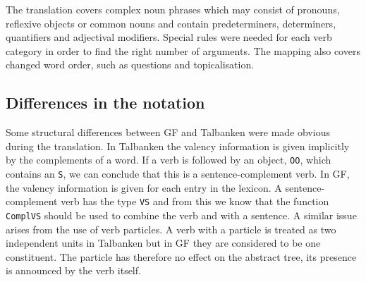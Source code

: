 \documentclass{report}
\begin{document}
The translation covers complex noun phrases which may consist of pronouns,
reflexive objects or common nouns and contain predeterminers, 
determiners, quantifiers and adjectival modifiers. Special rules were needed
for each verb category in order to find the right number of arguments.
The mapping also covers changed word order, such as questions and topicalisation.



\subsection{Differences in the notation}
Some structural differences between GF and Talbanken were made obvious during the
translation.
In Talbanken the valency information is given implicitly by the complements
of a word. If a verb is followed by an object, \verb-OO-, which contains an
\verb-S-, we can conclude that this is a sentence-complement verb.
In GF, the valency information is given for each entry in the lexicon.
A sentence-complement verb has the type \verb-VS- and from this we know 
that the function \verb-ComplVS- should be used to combine the verb and with a 
sentence.
A similar issue arises from the use of verb particles. A verb with a
particle is treated as two independent units in Talbanken but in GF they are
considered to be one constituent. %
The particle has therefore no effect on the abstract tree, its presence is
announced by the verb itself.
\end{document}
